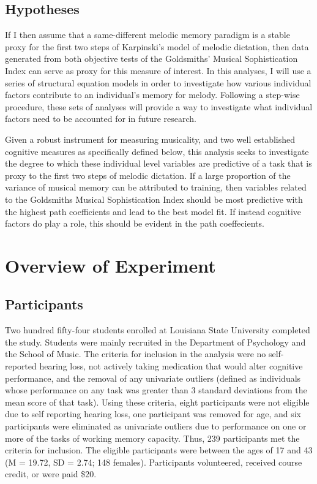 \documentclass[12pt,]{book}
\begin{document}
\hypertarget{hypotheses}{%
\subsection{Hypotheses}\label{hypotheses}}

If I then assume that a same-different melodic memory paradigm is a stable proxy for the first two steps of Karpinski's model of melodic dictation, then data generated from both objective tests of the Goldsmiths' Musical Sophistication Index can serve as proxy for this measure of interest.
In this analyses, I will use a series of structural equation models in order to investigate how various individual factors contribute to an individual's memory for melody.
Following a step-wise procedure, these sets of analyses will provide a way to investigate what individual factors need to be accounted for in future research.

Given a robust instrument for measuring musicality, and two well established cognitive measures as specifically defined below, this analysis seeks to investigate the degree to which these individual level variables are predictive of a task that is proxy to the first two steps of melodic dictation.
If a large proportion of the variance of musical memory can be attributed to training, then variables related to the Goldsmiths Musical Sophistication Index should be most predictive with the highest path coefficients and lead to the best model fit.
If instead cognitive factors do play a role, this should be evident in the path coeffecients.

\hypertarget{overview-of-experiment}{%
\section{Overview of Experiment}\label{overview-of-experiment}}

\hypertarget{participants}{%
\subsection{Participants}\label{participants}}

Two hundred fifty-four students enrolled at Louisiana State University completed the study.
Students were mainly recruited in the Department of Psychology and the School of Music.
The criteria for inclusion in the analysis were no self-reported hearing loss, not actively taking medication that would alter cognitive performance, and the removal of any univariate outliers (defined as individuals whose performance on any task was greater than 3 standard deviations from the mean score of that task).
Using these criteria, eight participants were not eligible due to self reporting hearing loss, one participant was removed for age, and six participants were eliminated as univariate outliers due to performance on one or more of the tasks of working memory capacity.
Thus, 239 participants met the criteria for inclusion.
The eligible participants were between the ages of 17 and 43 (M = 19.72, SD = 2.74; 148 females).
Participants volunteered, received course credit, or were paid \$20.
\end{document}

